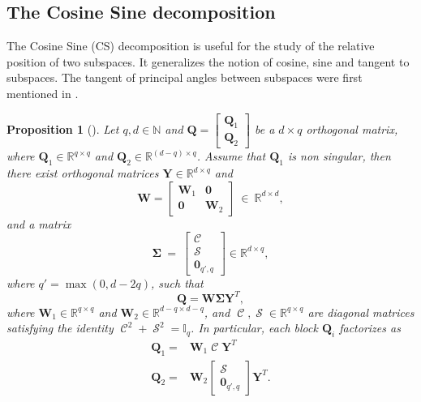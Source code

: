 \documentclass[twoside,11pt]{book}
\newtheorem{proposition}{Proposition}
\numberwithin{theorem}{chapter}
\numberwithin{definition}{chapter}
\numberwithin{proposition}{chapter}
\numberwithin{corollary}{chapter}
\numberwithin{example}{chapter}
\numberwithin{lemma}{chapter}
\numberwithin{assumption}{chapter}
\numberwithin{equation}{chapter}
\numberwithin{figure}{chapter}
\DeclareMathOperator{\Sinmatrix}{\mathcal{S}}
\DeclareMathOperator{\Cosmatrix}{\mathcal{C}}
\begin{document}
\begin{subappendices}
\subsection{The Cosine Sine decomposition}
The Cosine Sine (CS) decomposition is useful for the study of the relative position of two subspaces. It generalizes the notion of cosine, sine and tangent to subspaces. The tangent of principal angles between subspaces were first mentioned in \citealp{ZhKn13}.
\begin{proposition}[\citealp{GoVa96}]
Let $q,d \in \mathbb{N}$ and $\bm{Q} =
\left[
\begin{array}{c}
\bm{Q}_{1}  \\
\hline
\bm{Q}_{2}
\end{array}
\right]
$ be a $d\times q$ orthogonal matrix, where $\bm{Q}_{1} \in \mathbb{R}^{q \times q}$ and $\bm{Q}_{2} \in \mathbb{R}^{(d-q)\times q}$. Assume that $\bm{Q}_{1}$ is non singular, then there exist orthogonal matrices $\bm{Y}\in\mathbb{R}^{d \times q}$ and
\begin{equation}
 \bm{W} =
\left[
\begin{array}{c|c}
\bm{W}_{1} & \bm{0} \\
\hline
\bm{0} & \bm{W}_{2}
\end{array}
\right]~\in~\mathbb{R}^{d \times d},
\end{equation}
and a matrix
\begin{equation}
\bm{\Sigma}~=~\left[
\begin{array}{c}
\Cosmatrix \\
\hline
\Sinmatrix \\
\hline
\bm{0}_{q',q}
\end{array}
\right] \in \mathbb{R}^{d \times q},
\end{equation}
where $q' = \max(0,d-2q)$, such that
\begin{equation}
    \bm{Q} = \bm{W}\bm{\Sigma}\bm{Y}^{T},
\end{equation}
where $\bm{W}_{1} \in \mathbb{R}^{q \times q}$ and $\bm{W}_{2} \in \mathbb{R}^{d-q \times d-q}$, and $\Cosmatrix, \Sinmatrix \in \mathbb{R}^{q\times q}$ are diagonal matrices satisfying the identity $\Cosmatrix^{2} + \Sinmatrix^{2} = \mathbb{I}_{q}$.
In particular, each block $\bm{Q}_{i}$ factorizes as
\begin{equation}
\begin{split}
    \bm{Q}_{1} = & \bm{W}_{1}\Cosmatrix\bm{Y}^{T} \\
    \bm{Q}_{2} = & \bm{W}_{2}\left[
\begin{array}{c}
\Sinmatrix \\
\hline
\bm{0}_{q',q}
\end{array}
\right]\bm{Y}^{T} .\\
\end{split}
\end{equation}


\end{proposition}
\end{subappendices}
\end{document}

